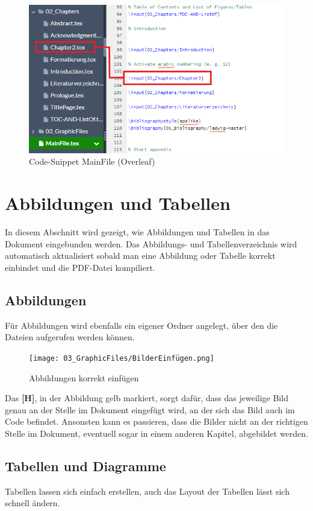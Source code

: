 \begin{figure}[H]
    \centering
    \includegraphics[width=\textwidth]{03_GraphicFiles/MainFile.png}
    \caption{Code-Snippet MainFile (Overleaf)}
    \label{fig:mainFile}
\end{figure}

\section{Abbildungen und Tabellen}
In diesem Abschnitt wird gezeigt, wie Abbildungen und Tabellen in das Dokument eingebunden werden. Das Abbildungs- und Tabellenverzeichnis wird automatisch aktualisiert sobald man eine Abbildung oder Tabelle korrekt einbindet und die PDF-Datei kompiliert.

\subsection{Abbildungen} \label{cha:figures}
Für Abbildungen wird ebenfalls ein eigener Ordner angelegt, über den die Dateien aufgerufen werden können.

\begin{figure}[H]
    \centering
    \texttt{[image: 03\_GraphicFiles/BilderEinfügen.png]}
    \caption{Abbildungen korrekt einfügen}
    \label{fig:picture}
\end{figure}

Das \textbf{[H]}, in der Abbildung gelb markiert, sorgt dafür, dass das jeweilige Bild genau an der Stelle im Dokument eingefügt wird, an der sich das Bild auch im Code befindet. Ansonsten kann es passieren, dass die Bilder nicht an der richtigen Stelle im Dokument, eventuell sogar in einem anderen Kapitel, abgebildet werden.

\newpage
\subsection{Tabellen und Diagramme}
Tabellen lassen sich einfach erstellen, auch das Layout der Tabellen lässt sich schnell ändern.

